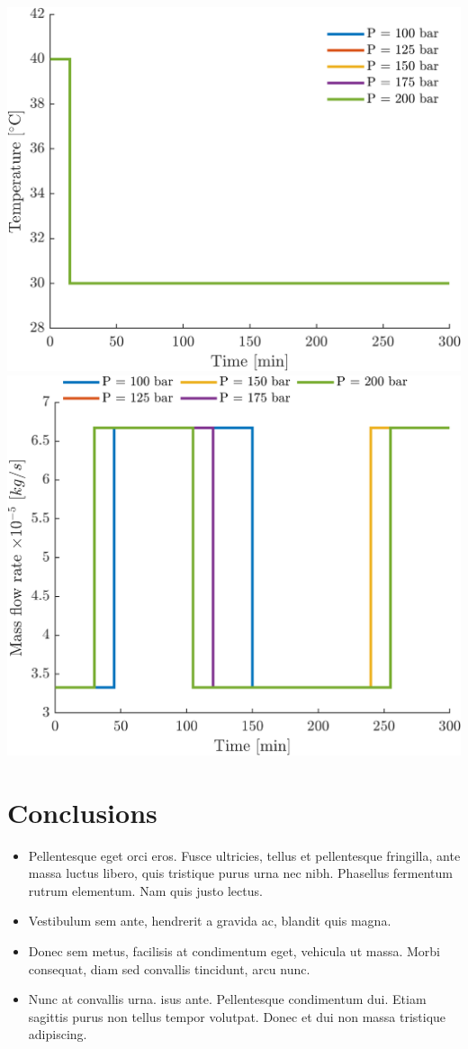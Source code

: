 \documentclass[a0,portrait]{a0poster}
\begin{document}
\begin{multicols}{2}
\begin{tcolorbox}[width=\linewidth, boxrule=0mm, sharp corners=all, colback=white]
	\begin{center}%
		\includegraphics[width=0.49\linewidth]{Profile_T.png}
		\includegraphics[width=0.49\linewidth]{Profile_F.png}
	\end{center}%
	
\end{tcolorbox}


\color{SaddleBrown} %

\section*{Conclusions}

\begin{itemize}
\item Pellentesque eget orci eros. Fusce ultricies, tellus et pellentesque fringilla, ante massa luctus libero, quis tristique purus urna nec nibh. Phasellus fermentum rutrum elementum. Nam quis justo lectus.
\item Vestibulum sem ante, hendrerit a gravida ac, blandit quis magna.
\item Donec sem metus, facilisis at condimentum eget, vehicula ut massa. Morbi consequat, diam sed convallis tincidunt, arcu nunc.
\item Nunc at convallis urna. isus ante. Pellentesque condimentum dui. Etiam sagittis purus non tellus tempor volutpat. Donec et dui non massa tristique adipiscing.
\end{itemize}


\end{multicols}
\end{document}
